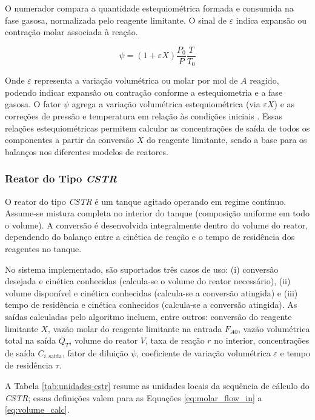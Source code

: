 O numerador compara a quantidade estequiométrica formada e consumida na fase gasosa, normalizada pelo reagente limitante. O sinal de $\varepsilon$ indica expansão ou contração molar associada à reação.

\begin{equation}
\psi = ( 1 + \varepsilon X ) \frac{P_{0}}{P} \frac{T}{T_{0}}
\label{eq:dilution_factor}
\end{equation}

Onde $\varepsilon$ representa a variação volumétrica ou molar por mol de $A$ reagido, podendo indicar expansão ou contração conforme a estequiometria e a fase gasosa. O fator $\psi$ agrega a variação volumétrica estequiométrica (via $\varepsilon X$) e as correções de pressão e temperatura em relação às condições iniciais \cite{levenspiel2000}. Essas relações estequiométricas permitem calcular as concentrações de saída de todos os componentes a partir da conversão $X$ do reagente limitante, sendo a base para os balanços nos diferentes modelos de reatores.

\subsubsection{Reator do Tipo \textit{CSTR}}

O reator do tipo \textit{CSTR} é um tanque agitado operando em regime contínuo. Assume-se mistura completa no interior do tanque (composição uniforme em todo o volume). A conversão é desenvolvida integralmente dentro do volume do reator, dependendo do balanço entre a cinética de reação e o tempo de residência dos reagentes no tanque.

No sistema implementado, são suportados três casos de uso: (i) conversão desejada e cinética conhecidas (calcula-se o volume do reator necessário), (ii) volume disponível e cinética conhecidas (calcula-se a conversão atingida) e (iii) tempo de residência e cinética conhecidos (calcula-se a conversão atingida). As saídas calculadas pelo algoritmo incluem, entre outros: conversão do reagente limitante $X$, vazão molar do reagente limitante na entrada $F_{A0}$, vazão volumétrica total na saída $Q_{T}$, volume do reator $V$, taxa de reação $r$ no interior, concentrações de saída $C_{i,\mathrm{saida}}$, fator de diluição $\psi$, coeficiente de variação volumétrica $\varepsilon$ e tempo de residência $\tau$.

A Tabela \ref{tab:unidades-cstr} resume as unidades locais da sequência de cálculo do \textit{CSTR}; essas definições valem para as Equações \ref{eq:molar_flow_in} a \ref{eq:volume_calc}.

